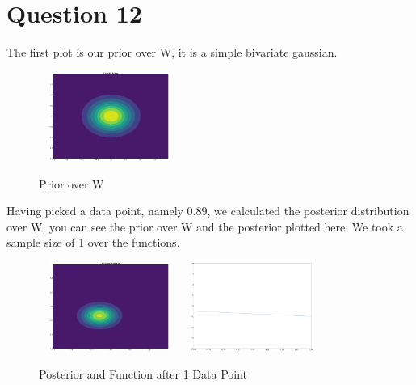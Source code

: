\documentclass[a4paper, 9pt]{article}
\begin{document}
\section*{Question 12}
The first plot is our prior over W, it is a simple bivariate gaussian.\\
\newline
\begin{figure}[H]
\begin{center}
\includegraphics[width=1.8in,height=1.15in]{posterior0} \\
\end{center}
\caption{Prior over W}
\end{figure} 
Having picked a data point, namely 0.89, we calculated the posterior distribution over W, you can see the prior over W and the posterior plotted here. We took a sample size of 1 over the functions.\\
\newline
\begin{figure}[H]
\begin{center}
\includegraphics[width=1.8in,height=1.15in]{posterior1}
\includegraphics[width=1.8in,height=1.15in]{data1} \\
\end{center}
\caption{Posterior and Function after 1 Data Point}
\end{figure}
\end{document}
